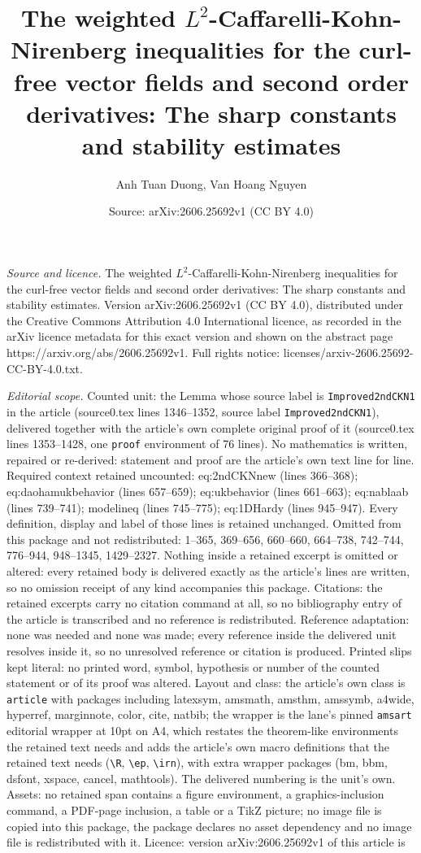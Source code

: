 \documentclass[10pt,a4paper]{amsart}
\title[The weighted $L^2$-Caffarelli-Kohn-Nirenberg inequalities fo]{The weighted $L^2$-Caffarelli-Kohn-Nirenberg inequalities for the curl-free vector fields and second order derivatives: The sharp constants and stability estimates}
\author{Anh Tuan Duong, Van Hoang Nguyen}
\date{Source: arXiv:2606.25692v1 (CC BY 4.0)}
\begin{document}
\maketitle

\noindent\emph{Source and licence.} The weighted $L^2$-Caffarelli-Kohn-Nirenberg inequalities for the curl-free vector fields and second order derivatives: The sharp constants and stability estimates. Version arXiv:2606.25692v1 (CC BY 4.0), distributed under the Creative Commons Attribution 4.0 International licence, as recorded in the arXiv licence metadata for this exact version and shown on the abstract page https://arxiv.org/abs/2606.25692v1. Full rights notice: licenses/arxiv-2606.25692-CC-BY-4.0.txt.\par\smallskip

\noindent\textit{Editorial scope.} Counted unit: the Lemma whose source label is \texttt{Improved2ndCKN1} in the article (source0.tex lines 1346--1352, source label \texttt{Improved2ndCKN1}), delivered together with the article's own complete original proof of it (source0.tex lines 1353--1428, one \texttt{proof} environment of 76 lines). No mathematics is written, repaired or re-derived: statement and proof are the article's own text line for line. Required context retained uncounted: eq:2ndCKNnew (lines 366--368); eq:daohamukbehavior (lines 657--659); eq:ukbehavior (lines 661--663); eq:nablaab (lines 739--741); modelineq (lines 745--775); eq:1DHardy (lines 945--947). Every definition, display and label of those lines is retained unchanged. Omitted from this package and not redistributed: 1--365, 369--656, 660--660, 664--738, 742--744, 776--944, 948--1345, 1429--2327. Nothing inside a retained excerpt is omitted or altered: every retained body is delivered exactly as the article's lines are written, so no omission receipt of any kind accompanies this package. Citations: the retained excerpts carry no citation command at all, so no bibliography entry of the article is transcribed and no reference is redistributed. Reference adaptation: none was needed and none was made; every reference inside the delivered unit resolves inside it, so no unresolved reference or citation is produced. Printed slips kept literal: no printed word, symbol, hypothesis or number of the counted statement or of its proof was altered. Layout and class: the article's own class is \texttt{article} with packages including latexsym, amsmath, amsthm, amssymb, a4wide, hyperref, marginnote, color, cite, natbib; the wrapper is the lane's pinned \texttt{amsart} editorial wrapper at 10pt on A4, which restates the theorem-like environments the retained text needs and adds the article's own macro definitions that the retained text needs (\texttt{\textbackslash R}, \texttt{\textbackslash ep}, \texttt{\textbackslash irn}), with extra wrapper packages (bm, bbm, dsfont, xspace, cancel, mathtools). The delivered numbering is the unit's own. Assets: no retained span contains a figure environment, a graphics-inclusion command, a PDF-page inclusion, a table or a TikZ picture; no image file is copied into this package, the package declares no asset dependency and no image file is redistributed with it. Licence: version arXiv:2606.25692v1 of this article is 
\end{document}
